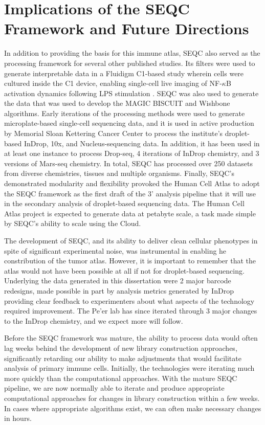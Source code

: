 \section{Implications of the SEQC Framework and Future Directions}
In addition to providing the basis for this immune atlas, SEQC also served as the processing framework for several other published studies. 
Its filters were used to generate interpretable data in a Fluidigm C1-based study wherein cells were cultured inside the C1 device, enabling single-cell live imaging of NF-$\kappa$B activation dynamics following LPS stimulation \citep{Lane2017}. 
SEQC was also used to generate the data that was used to develop the MAGIC \citep{Dijk2017} BISCUIT \citep{Prabhakaran2016,Azizi2017} and Wishbone \citep{Setty2016} algorithms. 
Early iterations of the processing methods were used to generate microplate-based single-cell sequencing data, and it is used in active production by Memorial Sloan Kettering Cancer Center to process the institute's droplet-based InDrop, 10x, and Nucleus-sequencing data. 
In addition, it has been used in at least one instance to process Drop-seq, 4 iterations of InDrop chemistry, and 3 versions of Mars-seq chemistry. 
In total, SEQC has processed over 250 datasets from diverse chemistries, tissues and multiple organisms.  
Finally, SEQC's demonstrated modularity and flexibility provoked the Human Cell Atlas to adopt the SEQC framework as the first draft of the 3' analysis pipeline that it will use in the secondary analysis of droplet-based sequencing data. 
The Human Cell Atlas project is expected to generate data at petabyte scale, a task made simple by SEQC's ability to scale using the Cloud.  

The development of SEQC, and its ability to deliver clean cellular phenotypes in spite of significant experimental noise, was instrumental in enabling he constribution of the tumor atlas. 
However, it is important to remember that the atlas would not have been possible at all if not for droplet-based sequencing.
Underlying the data generated in this dissertation were 2 major barcode redesigns, made possible in part by analysis metrics generated by InDrop providing clear feedback to experimenters about what aspects of the technology required improvement. 
The Pe'er lab has since iterated through $3$ major changes to the InDrop chemistry, and we expect more will follow.  

Before the SEQC framework was mature, the ability to process data would often lag weeks behind the development of new library construction approaches, significantly retarding our ability to make adjustments that would facilitate analysis of primary immune cells. 
Initially, the technologies were iterating much more quickly than the computational approaches. With the mature SEQC pipeline, we are now normally able to iterate and produce appropriate computational approaches for changes in library construction within a few weeks.  
In cases where appropriate algorithms exist, we can often make necessary changes in hours. 

